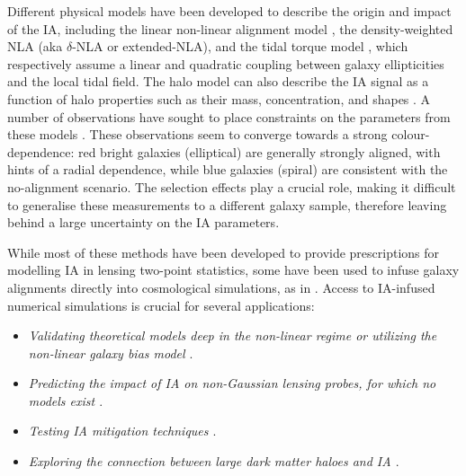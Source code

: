 Different physical models have been developed to describe the origin and impact of the IA, including the linear non-linear alignment model \citep[NLA hereafter, ][]{BridleKing2007}, the density-weighted NLA (aka $\delta$-NLA or extended-NLA), and the tidal torque model \citep[][TT hereafter]{BlazekTATT2017}, which respectively assume a linear and quadratic coupling between galaxy ellipticities and the local tidal field. 
The halo model can also describe the IA signal as a function of halo properties such as their mass, concentration, and shapes \citep{FortunaIA}.
A number of observations have sought to place constraints on the parameters from these models \citep[\eg][]{Singh, Sammuroff, Christos, Fortuna, Johnston}.
These observations seem to converge towards a strong colour-dependence: red bright galaxies (elliptical) are generally strongly aligned, with hints of a radial dependence, while blue galaxies (spiral) are consistent with the no-alignment scenario.
The selection effects play a crucial role, making it difficult to generalise these measurements to a different galaxy sample, therefore leaving behind a large uncertainty on the IA parameters.


While most of these methods have been developed to provide prescriptions for modelling IA in lensing  two-point statistics, some have been used to infuse galaxy alignments directly into cosmological simulations, as in \citet{Fluri2019, Tidalator2D, MICE_IA, Borg, Lanzieri}. 
Access to IA-infused numerical simulations is crucial for several applications:
\begin{itemize}
    \item \textit{Validating theoretical models deep in the non-linear regime or utilizing the non-linear galaxy bias model \citep{IA_gal_bias}}.
    \item \textit{Predicting the impact of IA on non-Gaussian lensing probes, for which no models exist \citep{ZuercherXYZ, Tidalator2D}}.
    \item \textit{Testing IA mitigation techniques \citep{IA_selfCalibration}}.
    \item \textit{Exploring the connection between large dark matter haloes and IA \citep{vanAlfen}}.
\end{itemize}
{}

